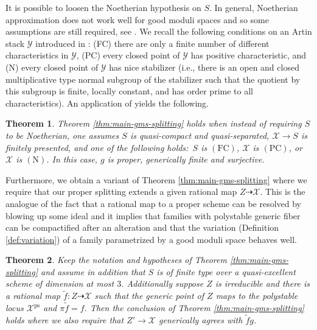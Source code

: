 \documentclass{amsart}
\newtheorem{theorem}{Theorem}[section]
\theoremstyle{definition}
\newcommand{\cX}{\mathcal{X}}
\newcommand{\cY}{\mathcal{Y}}
\DeclareMathOperator{\ps}{ps}
\begin{document}
	It is possible to loosen the Noetherian hypothesis on $S$. In general, Noetherian approximation does not work well for good moduli spaces and so some assumptions are still required, see \cite[\S7]{AHRetalelocal}. We recall the following conditions on an Artin stack $\cY$ introduced in \cite[\S15]{AHRetalelocal}: (FC) there are only a finite number of different characteristics in $\cY$, (PC) every closed point of $\cY$ has positive characteristic, and (N) every closed point of $\cY$ has nice stabilizer (i.e., there is an open and closed multiplicative type normal subgroup of the stabilizer such that the quotient by this subgroup is finite, locally constant, and has order prime to all characteristics). An application of \cite{Rydh2015, RydhNoetherianAbsolute} yields the following. 
	
	
	\begin{theorem}\label{thm:main-gms-splitting-nonNoeth}
		Theorem \ref{thm:main-gms-splitting} holds when instead of requiring $S$ to be Noetherian, one assumes $S$ is quasi-compact and quasi-separated, $\cX \to S$ is finitely presented, and one of the following holds:~$S$ is $(\mathrm{FC})$, $\cX$ is $(\mathrm{PC})$, or $\cX$ is $(\mathrm{N})$. In this case, $g$ is proper, generically finite and surjective. 
	\end{theorem}
	
	
	Furthermore, we obtain a variant of Theorem \ref{thm:main-gms-splitting} where we require that our proper splitting extends a given rational map $Z \dashrightarrow \cX$. This is the analogue of the fact that a rational map to a proper scheme can be resolved by blowing up some ideal and it implies that families with polystable generic fiber can be compactified after an alteration and that the variation (Definition \ref{def:variation}) of a family parametrized by a good moduli space behaves well. 
	
	\begin{theorem}\label{thm:main-gms-splitting-rational-version}
		Keep the notation and hypotheses of Theorem \ref{thm:main-gms-splitting} and assume in addition that $S$ is of finite type over a quasi-excellent scheme of dimension at most $3$. Additionally suppose $Z$ is irreducible and there is a rational map $\widetilde{f}\colon Z\dasharrow\cX$ such that the generic point of $Z$ maps to the polystable locus $\cX^{\ps}$ and $\pi\widetilde{f}=f$. Then the conclusion of Theorem \ref{thm:main-gms-splitting} holds where we also require that $Z'\to\cX$ generically agrees with $\widetilde{f}g$. 
	\end{theorem}
	
\end{document}
